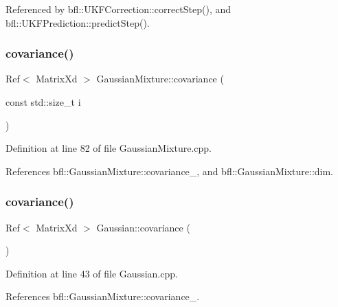 Referenced by bfl\+::\+U\+K\+F\+Correction\+::correct\+Step(), and bfl\+::\+U\+K\+F\+Prediction\+::predict\+Step().

\mbox{\label{classbfl_1_1GaussianMixture_a80a6fa7d9edfc95103236378b4da3f7f}} 
\subsubsection{\texorpdfstring{covariance()}{covariance()}\hspace{0.1cm}{\footnotesize\ttfamily [1/8]}}
{\footnotesize\ttfamily Ref$<$ Matrix\+Xd $>$ Gaussian\+Mixture\+::covariance (\begin{DoxyParamCaption}\item[{const std\+::size\+\_\+t}]{i }\end{DoxyParamCaption})\hspace{0.3cm}{\ttfamily [inherited]}}



Definition at line 82 of file Gaussian\+Mixture.\+cpp.



References bfl\+::\+Gaussian\+Mixture\+::covariance\+\_\+, and bfl\+::\+Gaussian\+Mixture\+::dim.

\mbox{\label{classbfl_1_1Gaussian_a23dbc924dadc0061c392a7435eb3befe}} 
\subsubsection{\texorpdfstring{covariance()}{covariance()}\hspace{0.1cm}{\footnotesize\ttfamily [2/8]}}
{\footnotesize\ttfamily Ref$<$ Matrix\+Xd $>$ Gaussian\+::covariance (\begin{DoxyParamCaption}{ }\end{DoxyParamCaption})}



Definition at line 43 of file Gaussian.\+cpp.



References bfl\+::\+Gaussian\+Mixture\+::covariance\+\_\+.

\mbox{\label{classbfl_1_1GaussianMixture_ad2c74407e682e3b4322df2d0e1cef28e}} 

